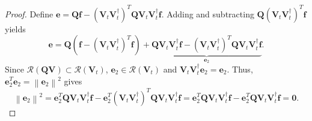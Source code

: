 \documentclass[preprint,10pt]{elsarticle}
\theoremstyle{definition}
\theoremstyle{lemma}
\theoremstyle{theorem}
\theoremstyle{assumption}
\newcommand{\diag}[1]{{\rm diag}\LRp{#1}}
\newcommand{\nor}[1]{\left\| #1 \right\|}
\newcommand{\LRp}[1]{\left( #1 \right)}
\begin{document}
\begin{proof}
Define $\bm{e} = \bm{Q}\bm{f} - \LRp{\bm{V}_t\bm{V}_t^{\dagger}}^T\bm{Q}\bm{V}_t\bm{V}_t^{\dagger}\bm{f}$.  Adding and subtracting $\bm{Q}\LRp{\bm{V}_t\bm{V}_t^{\dagger}}^T\bm{f}$ yields
\[
\bm{e} = \bm{Q}\LRp{\bm{f} - \LRp{\bm{V}_t\bm{V}_t^{\dagger}}^T\bm{f}} + \underbrace{\bm{Q}{\bm{V}_t\bm{V}_t^{\dagger}}\bm{f} - \LRp{\bm{V}_t\bm{V}_t^{\dagger}}^T\bm{Q}\bm{V}_t\bm{V}_t^{\dagger}\bm{f}}_{\bm{e}_2}.
\]
Since $\mathcal{R}\LRp{\bm{Q}\bm{V}} \subset \mathcal{R}\LRp{\bm{V}_t}$, $\bm{e}_2\in \mathcal{R}\LRp{\bm{V}_t}$ and $\bm{V}_t\bm{V}_t^\dagger\bm{e}_2 = \bm{e}_2$.  Thus, $\bm{e}_2^T\bm{e}_2 = \nor{\bm{e}_2}^2$ gives
\[
\nor{\bm{e}_2}^2 = \bm{e}_2^T\bm{Q}{\bm{V}_t\bm{V}_t^{\dagger}}\bm{f} - \bm{e}_2^T\LRp{\bm{V}_t\bm{V}_t^{\dagger}}^T\bm{Q}\bm{V}_t\bm{V}_t^{\dagger}\bm{f} 
= \bm{e}_2^T\bm{Q}{\bm{V}_t\bm{V}_t^{\dagger}}\bm{f} - \bm{e}_2^T\bm{Q}\bm{V}_t\bm{V}_t^{\dagger}\bm{f} = \bm{0}.
\]

\end{proof}
\end{document}
